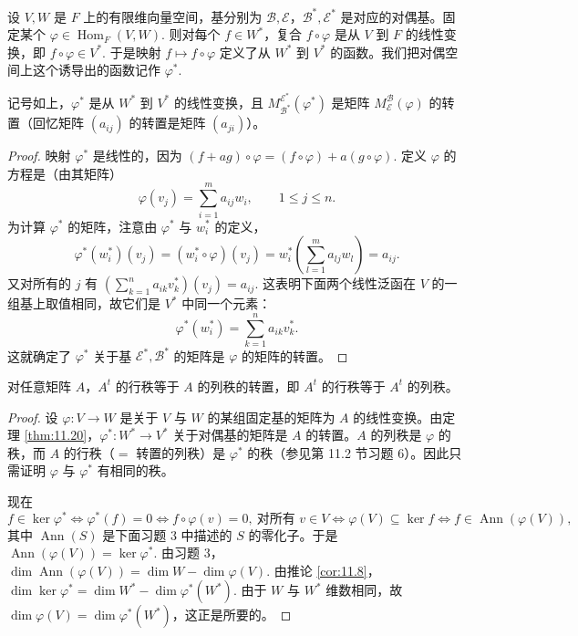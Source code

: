 设 \(V, W\) 是 \(F\) 上的有限维向量空间，基分别为 \(\mathcal{B}, \mathcal{E}\)，\(\mathcal{B}^*, \mathcal{E}^*\) 是对应的对偶基。固定某个 \(\varphi \in \operatorname{Hom}_F(V, W)\). 则对每个 \(f \in W^*\)，复合 \(f \circ \varphi\) 是从 \(V\) 到 \(F\) 的线性变换，即 \(f \circ \varphi \in V^*\). 于是映射 \(f \mapsto f \circ \varphi\) 定义了从 \(W^*\) 到 \(V^*\) 的函数。我们把对偶空间上这个诱导出的函数记作 \(\varphi^*\).

\begin{theorem}\label{thm:11.20}
记号如上，\(\varphi^*\) 是从 \(W^*\) 到 \(V^*\) 的线性变换，且 \(M_{\mathcal{B}^*}^{\mathcal{E}^*}(\varphi^*)\) 是矩阵 \(M_{\mathcal{E}}^{\mathcal{B}}(\varphi)\) 的转置（回忆矩阵 \((a_{ij})\) 的转置是矩阵 \((a_{ji})\)）。
\end{theorem}

\begin{proof}
映射 \(\varphi^*\) 是线性的，因为 \((f+ag) \circ \varphi = (f \circ \varphi)+a(g \circ \varphi)\). 定义 \(\varphi\) 的方程是（由其矩阵）
\[
\varphi(v_j) = \sum_{i=1}^m a_{ij}w_i, \qquad 1 \leq j \leq n.
\]
为计算 \(\varphi^*\) 的矩阵，注意由 \(\varphi^*\) 与 \(w_i^*\) 的定义，
\[
\varphi^*(w_i^*)(v_j) = (w_i^* \circ \varphi)(v_j) = w_i^*\left(\sum_{l=1}^m a_{lj}w_l\right) = a_{ij}.
\]
又对所有的 \(j\) 有 \(\left(\sum_{k=1}^n a_{ik}v_k^*\right)(v_j) = a_{ij}\). 这表明下面两个线性泛函在 \(V\) 的一组基上取值相同，故它们是 \(V^*\) 中同一个元素：
\[
\varphi^*(w_i^*) = \sum_{k=1}^n a_{ik}v_k^*.
\]
这就确定了 \(\varphi^*\) 关于基 \(\mathcal{E}^*, \mathcal{B}^*\) 的矩阵是 \(\varphi\) 的矩阵的转置。
\end{proof}

\begin{corollary}\label{cor:11.21}
对任意矩阵 \(A\)，\(A^t\) 的行秩等于 \(A\) 的列秩的转置，即 \(A^t\) 的行秩等于 \(A^t\) 的列秩。
\end{corollary}

\begin{proof}
设 \(\varphi : V \to W\) 是关于 \(V\) 与 \(W\) 的某组固定基的矩阵为 \(A\) 的线性变换。由定理 \ref{thm:11.20}，\(\varphi^* : W^* \to V^*\) 关于对偶基的矩阵是 \(A\) 的转置。\(A\) 的列秩是 \(\varphi\) 的秩，而 \(A\) 的行秩（\(=\) 转置的列秩）是 \(\varphi^*\) 的秩（参见第 11.2 节习题 6）。因此只需证明 \(\varphi\) 与 \(\varphi^*\) 有相同的秩。

现在
\[
f \in \ker\varphi^* \iff \varphi^*(f) = 0 \iff f \circ \varphi(v) = 0,\ \text{对所有 } v \in V \iff \varphi(V) \subseteq \ker f \iff f \in \operatorname{Ann}(\varphi(V)),
\]
其中 \(\operatorname{Ann}(S)\) 是下面习题 3 中描述的 \(S\) 的零化子。于是 \(\operatorname{Ann}(\varphi(V)) = \ker\varphi^*\). 由习题 3，\(\dim\operatorname{Ann}(\varphi(V)) = \dim W-\dim\varphi(V)\). 由推论 \ref{cor:11.8}，\(\dim\ker\varphi^* = \dim W^*-\dim\varphi^*(W^*)\). 由于 \(W\) 与 \(W^*\) 维数相同，故 \(\dim\varphi(V) = \dim\varphi^*(W^*)\)，这正是所要的。
\end{proof}

